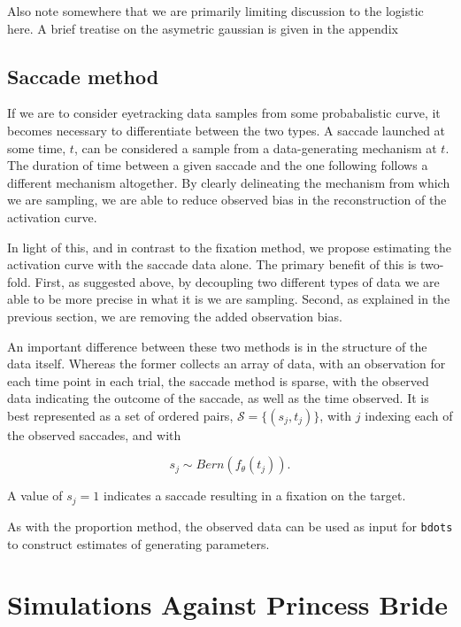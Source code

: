 \documentclass{article}
\newcommand{\xt}{\texttt}%
\begin{document}
Also note somewhere that we are primarily limiting discussion to the logistic here. A brief treatise on the asymetric gaussian is given in the appendix


\subsection{Saccade method}

If we are to consider eyetracking data samples from some probabalistic curve, it becomes necessary to differentiate between the two types. A saccade launched at some time, $t$, can be considered a sample from a data-generating mechanism at $t$. The duration of time between a given saccade and the one following follows a different mechanism altogether. By clearly delineating the mechanism from which we are sampling, we are able to reduce observed bias in the reconstruction of the activation curve.

In light of this, and in contrast to the fixation method, we propose estimating the activation curve with the saccade data alone. The primary benefit of this is two-fold. First, as suggested above, by decoupling two different types of data we are able to be more precise in what it is we are sampling. Second, as explained in the previous section, we are removing the added observation bias. 


An important difference between these two methods is in the structure of the data itself. Whereas the former collects an array of data, with an observation for each time point in each trial, the saccade method is sparse, with the observed data indicating the outcome of the saccade, as well as the time observed. It is best represented as a set of ordered pairs, $\mathcal{S} = \{(s_{j}, t_j)\}$, with $j$ indexing each of the observed saccades, and with

\begin{equation}
s_{j} \sim Bern(f_{\theta}(t_j)).
\end{equation}

A value of $s_j = 1$ indicates a saccade resulting in a fixation on the target. 


As with the proportion method, the observed data can be used as input for \xt{bdots} to construct estimates of generating parameters. 


\section{Simulations Against Princess Bride}
\end{document}
